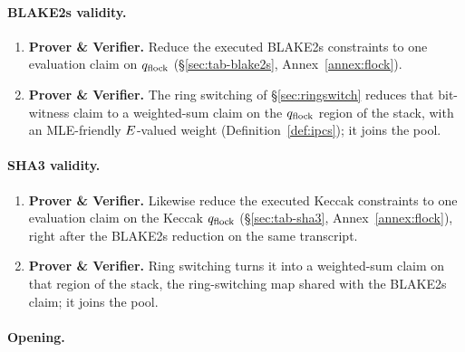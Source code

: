 \paragraph{BLAKE2s validity.}

\begin{enumerate}
\item \textbf{Prover \& Verifier.} Reduce the executed BLAKE2s constraints to one evaluation claim on $q_{\mathrm{flock}}$ (\S\ref{sec:tab-blake2s}, Annex~\ref{annex:flock}).
\item \textbf{Prover \& Verifier.} The ring switching of \S\ref{sec:ringswitch} reduces that bit-witness claim to a weighted-sum claim on the $q_{\mathrm{flock}}$ region of the stack, with an MLE-friendly $E$-valued weight (Definition~\ref{def:ipcs}); it joins the pool.
\end{enumerate}

\paragraph{SHA3 validity.}

\begin{enumerate}
\item \textbf{Prover \& Verifier.} Likewise reduce the executed Keccak constraints to one evaluation claim on the Keccak $q_{\mathrm{flock}}$ (\S\ref{sec:tab-sha3}, Annex~\ref{annex:flock}), right after the BLAKE2s reduction on the same transcript.
\item \textbf{Prover \& Verifier.} Ring switching turns it into a weighted-sum claim on that region of the stack, the ring-switching map shared with the BLAKE2s claim; it joins the pool.
\end{enumerate}

\paragraph{Opening.}

